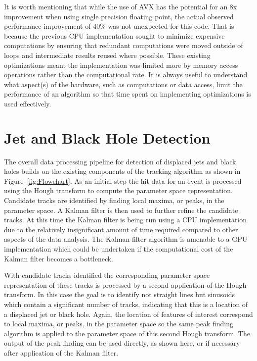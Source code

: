 \documentclass[preprint,sort&compress]{elsarticle}
\begin{document}
It is worth mentioning that while the use of AVX has the potential for an 8x improvement when using single precision floating point, the actual observed performance improvement of 40\% was not unexpected for this code.  That is because the previous CPU implementation sought to minimize expensive computations by ensuring that redundant computations were moved outside of loops and intermediate results reused where possible.  These existing optimizations meant the implementation was limited more by memory access operations rather than the computational rate.  It is always useful to understand what aspect(s) of the hardware, such as computations or data access, limit the performance of an algorithm so that time spent on implementing optimizations is used effectively.

\section{Jet and Black Hole Detection}

The overall data processing pipeline for detection of displaced jets and black holes builds on the existing components of the tracking algorithm as shown in Figure~\ref{fig:Flowchart}.  As an initial step the hit data for an event is processed using the Hough transform to compute the parameter space representation.  Candidate tracks are identified by finding local maxima, or peaks, in the parameter space.  A Kalman filter is then used to further refine the candidate tracks.  At this time the Kalman filter is being run using a CPU implementation due to the relatively insignificant amount of time required compared to other aspects of the data analysis.  The Kalman filter algorithm is amenable to a GPU implementation which could be undertaken if the computational cost of the Kalman filter becomes a bottleneck.

With candidate tracks identified the corresponding parameter space representation of these tracks is processed by a second application of the Hough transform.  In this case the goal is to identify not straight lines but sinusoids which contain a significant number of tracks, indicating that this is a location of a displaced jet or black hole.  Again, the location of features of interest correspond to local maxima, or peaks, in the parameter space so the same peak finding algorithm is applied to the parameter space of this second Hough transform.  The output of the peak finding can be used directly, as shown here, or if necessary after application of the Kalman filter.
\end{document}
